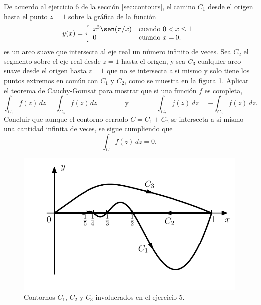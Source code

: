 \documentclass[a4paper]{report}
\begin{document}
De acuerdo al ejercicio 6 de la sección \ref{sec:contours}, el camino \(C_1\) desde el origen hasta el punto \(z=1\) sobre la gráfica de la función
\[
 y(x)=\left\{ 
 \begin{array}{ll}
  x^3\sen(\pi/x)&\textrm{cuando }0<x\leq1\\
  0&\textrm{cuando }x=0.
 \end{array}
 \right.
\]
es un arco suave que intersecta al eje real un número infinito de veces. Sea \(C_2\) el segmento sobre el eje real desde \(z=1\) hasta el origen, y sea \(C_3\) cualquier arco suave desde el origen hasta \(z=1\) que no se intersecta a si mismo y solo tiene los puntos extremos en común con \(C_1\) y \(C_2\), como se muestra en la figura \ref{fig:exercise_53_05}. Aplicar el teorema de Cauchy-Goursat para mostrar que si una función \(f\) es completa,
\[
 \int_{C_1}f(z)\,dz=\int_{C_3}f(z)\,dz
 \qquad\qquad\textrm{y}\qquad\qquad
 \int_{C_2}f(z)\,dz=-\int_{C_3}f(z)\,dz.
\]
Concluir que aunque el contorno cerrado \(C=C_1+C_2\) se intersecta a si mismo una cantidad infinita de veces, se sigue cumpliendo que 
\[
 \int_{C}f(z)\,dz=0.
\]
\begin{figure}[!htb]
 \begin{minipage}[c]{0.56\textwidth}
  \includegraphics[width=\textwidth]{figuras/exercise_53_05.pdf}
 \end{minipage}\hfill
 \begin{minipage}[c]{0.34\textwidth}
    \caption{
       Contornos \(C_1\), \(C_2\) y \(C_3\) involucrados en el ejercicio 5.
    }\label{fig:exercise_53_05}
 \end{minipage}
\end{figure}
\end{document}
